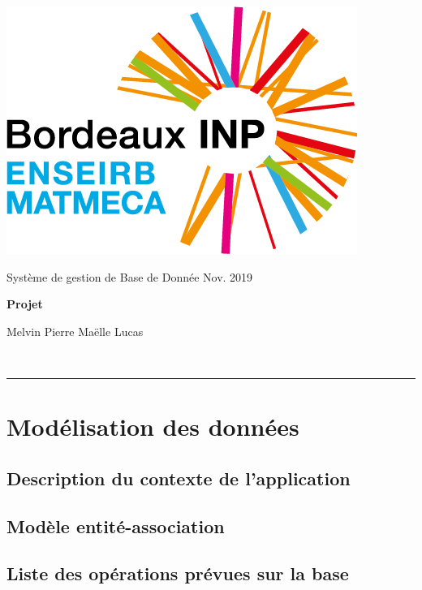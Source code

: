 \documentclass[a4paper,10.5pt]{article}
\begin{document}
\noindent
\begin{minipage}{0.20\textwidth}
\includegraphics[width=\textwidth]{logo}
\end{minipage}
\hfill
\begin{minipage}{0.71\textwidth}
Système de gestion de Base de Donnée \hfill Nov. 2019\\

\begin{center}
{\Large \textbf{Projet}}

\vspace{0.5em}
 \large Melvin  \quad Pierre  \quad Maëlle  \quad Lucas 
\end{center}\vspace{0.3em}


\end{minipage}\\

\noindent
\rule{\linewidth}{0.5mm}
\setcounter{section}{1}

\section{Modélisation des données}
\subsection{Description du contexte de l'application}
\subsection{Modèle entité-association}
\subsection{Liste des opérations prévues sur la base}
\end{document}
